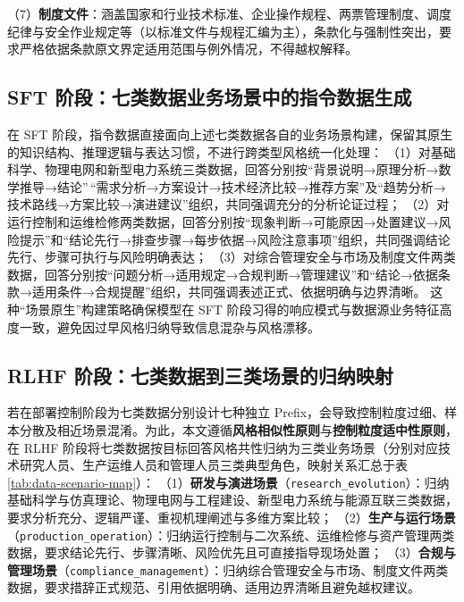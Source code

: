 \documentclass[fontset=fandol,type=master,campus=shenzhen,etitleauto=true]{hithesisbook}
\begin{document}
\noindent （7）\textbf{制度文件}：涵盖国家和行业技术标准、企业操作规程、两票管理制度、调度纪律与安全作业规定等（以标准文件与规程汇编为主），条款化与强制性突出，要求严格依据条款原文界定适用范围与例外情况，不得越权解释。

\subsection{SFT 阶段：七类数据业务场景中的指令数据生成}\label{sft-ux9636ux6bb5ux4e03ux7c7bux6570ux636eux4e1aux52a1ux573aux666fux4e2dux7684ux6307ux4ee4ux6570ux636eux751fux6210}

在 SFT 阶段，指令数据直接面向上述七类数据各自的业务场景构建，保留其原生的知识结构、推理逻辑与表达习惯，不进行跨类型风格统一化处理：
（1）对基础科学、物理电网和新型电力系统三类数据，回答分别按``背景说明→原理分析→数学推导→结论''\,``需求分析→方案设计→技术经济比较→推荐方案''及``趋势分析→技术路线→方案比较→演进建议''组织，共同强调充分的分析论证过程；
（2）对运行控制和运维检修两类数据，回答分别按``现象判断→可能原因→处置建议→风险提示''和``结论先行→排查步骤→每步依据→风险注意事项''组织，共同强调结论先行、步骤可执行与风险明确表达；
（3）对综合管理安全与市场及制度文件两类数据，回答分别按``问题分析→适用规定→合规判断→管理建议''和``结论→依据条款→适用条件→合规提醒''组织，共同强调表述正式、依据明确与边界清晰。
这种``场景原生''构建策略确保模型在 SFT 阶段习得的响应模式与数据源业务特征高度一致，避免因过早风格归纳导致信息混杂与风格漂移。

\subsection{RLHF 阶段：七类数据到三类场景的归纳映射}\label{rlhf-ux9636ux6bb5ux4e03ux7c7bux6570ux636eux5230ux4e09ux7c7bux573aux666fux7684ux5f52ux7eb3ux6620ux5c04}

若在部署控制阶段为七类数据分别设计七种独立 Prefix，会导致控制粒度过细、样本分散及相近场景混淆。为此，本文遵循\textbf{风格相似性原则}与\textbf{控制粒度适中性原则}，在 RLHF 阶段将七类数据按目标回答风格共性归纳为三类业务场景（分别对应技术研究人员、生产运维人员和管理人员三类典型角色，映射关系汇总于表 \ref{tab:data-scenario-map}）：
（1）\textbf{研发与演进场景}（\texttt{research\_evolution}）：归纳基础科学与仿真理论、物理电网与工程建设、新型电力系统与能源互联三类数据，要求分析充分、逻辑严谨、重视机理阐述与多维方案比较；
（2）\textbf{生产与运行场景}（\texttt{production\_operation}）：归纳运行控制与二次系统、运维检修与资产管理两类数据，要求结论先行、步骤清晰、风险优先且可直接指导现场处置；
（3）\textbf{合规与管理场景}（\texttt{compliance\_management}）：归纳综合管理安全与市场、制度文件两类数据，要求措辞正式规范、引用依据明确、适用边界清晰且避免越权建议。
\end{document}
